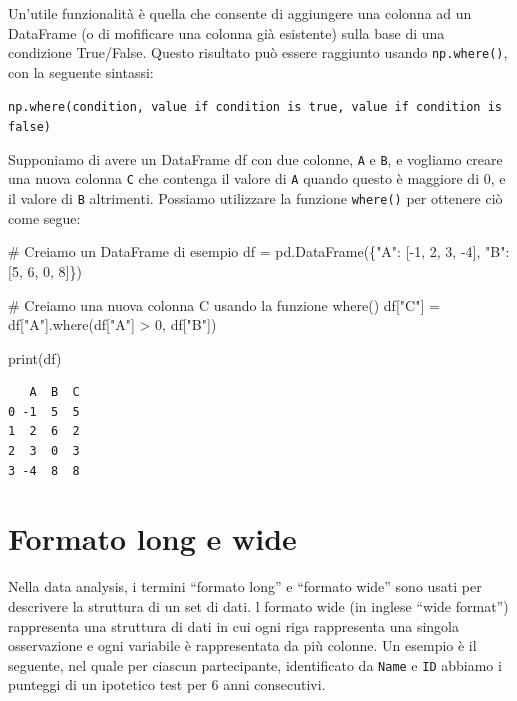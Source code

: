 \documentclass[
  letterpaper,
  krantz2]{{[}./krantz{]}}
\newenvironment{Shaded}{\begin{snugshade}}{\end{snugshade}}
\newcommand{\BuiltInTok}[1]{\textcolor[rgb]{0.00,0.23,0.31}{#1}}
\newcommand{\CommentTok}[1]{\textcolor[rgb]{0.37,0.37,0.37}{#1}}
\newcommand{\DecValTok}[1]{\textcolor[rgb]{0.68,0.00,0.00}{#1}}
\newcommand{\NormalTok}[1]{\textcolor[rgb]{0.00,0.23,0.31}{#1}}
\newcommand{\OperatorTok}[1]{\textcolor[rgb]{0.37,0.37,0.37}{#1}}
\newcommand{\StringTok}[1]{\textcolor[rgb]{0.13,0.47,0.30}{#1}}
\begin{document}
Un'utile funzionalità è quella che consente di aggiungere una colonna ad
un DataFrame (o di mofificare una colonna già esistente) sulla base di
una condizione True/False. Questo risultato può essere raggiunto usando
\texttt{np.where()}, con la seguente sintassi:

\texttt{np.where(condition,\ value\ if\ condition\ is\ true,\ value\ if\ condition\ is\ false)}

Supponiamo di avere un DataFrame df con due colonne, \texttt{A} e
\texttt{B}, e vogliamo creare una nuova colonna \texttt{C} che contenga
il valore di \texttt{A} quando questo è maggiore di 0, e il valore di
\texttt{B} altrimenti. Possiamo utilizzare la funzione \texttt{where()}
per ottenere ciò come segue:

\begin{Shaded}
\begin{Highlighting}[]
\CommentTok{\# Creiamo un DataFrame di esempio}
\NormalTok{df }\OperatorTok{=}\NormalTok{ pd.DataFrame(\{}\StringTok{"A"}\NormalTok{: [}\OperatorTok{{-}}\DecValTok{1}\NormalTok{, }\DecValTok{2}\NormalTok{, }\DecValTok{3}\NormalTok{, }\OperatorTok{{-}}\DecValTok{4}\NormalTok{], }\StringTok{"B"}\NormalTok{: [}\DecValTok{5}\NormalTok{, }\DecValTok{6}\NormalTok{, }\DecValTok{0}\NormalTok{, }\DecValTok{8}\NormalTok{]\})}

\CommentTok{\# Creiamo una nuova colonna \textquotesingle{}C\textquotesingle{} usando la funzione where()}
\NormalTok{df[}\StringTok{"C"}\NormalTok{] }\OperatorTok{=}\NormalTok{ df[}\StringTok{"A"}\NormalTok{].where(df[}\StringTok{"A"}\NormalTok{] }\OperatorTok{\textgreater{}} \DecValTok{0}\NormalTok{, df[}\StringTok{"B"}\NormalTok{])}

\BuiltInTok{print}\NormalTok{(df)}
\end{Highlighting}
\end{Shaded}

\begin{verbatim}
   A  B  C
0 -1  5  5
1  2  6  2
2  3  0  3
3 -4  8  8
\end{verbatim}

\section{Formato long e wide}\label{formato-long-e-wide}

Nella data analysis, i termini ``formato long'' e ``formato wide'' sono
usati per descrivere la struttura di un set di dati. l formato wide (in
inglese ``wide format'') rappresenta una struttura di dati in cui ogni
riga rappresenta una singola osservazione e ogni variabile è
rappresentata da più colonne. Un esempio è il seguente, nel quale per
ciascun partecipante, identificato da \texttt{Name} e \texttt{ID}
abbiamo i punteggi di un ipotetico test per 6 anni consecutivi.
\end{document}
